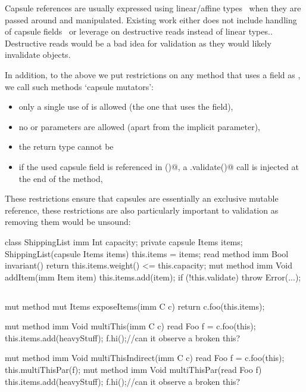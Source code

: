 Capsule references are usually expressed using linear/affine types~\cite{Boyland01} when they are passed around and manipulated. Existing work either does not include handling of capsule fields~\cite{ServettoEtAl13a,ServettoZucca15} or leverage on destructive reads instead of linear types.\cite{GordonEtAl12,clebsch2015deny}.
Destructive reads would be a bad idea for validation as they would likely invalidate objects.

In addition, to the above we put restrictions on any method that uses a \Q@capsule@ field as \Q@mut@, we call such methods `capsule mutators':
\begin{itemize}
\item only a single use of \Q@this@ is allowed (the one that uses the field),
\item no \Q@mut@ or \Q@read@ parameters are allowed (apart from the implicit \Q@this@ parameter),
\item the return type cannot be \Q@mut@
\item if the used capsule field is referenced in \Q@validate()@, a \Q@this.validate()@ call is injected at the end of the method,
\end{itemize}
These restrictions ensure that capsules are essentially an exclusive mutable reference, these restrictions are also particularly important to validation as removing them would be unsound:

class ShippingList{
  imm Int capacity; %
  private capsule Items items;
  ShippingList(capsule Items items) {this.items = items;}
  read method imm Bool invariant() {	%
    return this.items.weight() <= this.capacity;
  }
  mut method imm Void addItem(imm Item item) {
    this.items.add(item); %
    if (!this.validate) {throw Error(...);}
}}

\subsection{}
mut method mut Items exposeItems(imm C c) {
  return c.foo(this.items);
}

mut method imm Void multiThis(imm C c) {
  read Foo f = c.foo(this);
  this.items.add(heavyStuff);
  f.hi();//can it observe a broken this?
}

mut method imm Void multiThisIndirect(imm C c) {
  read Foo f = c.foo(this);
  this.multiThisPar(f);
}
mut method imm Void multiThisPar(read Foo f) {
  this.items.add(heavyStuff);
  f.hi();//can it observe a broken this?  
  }


